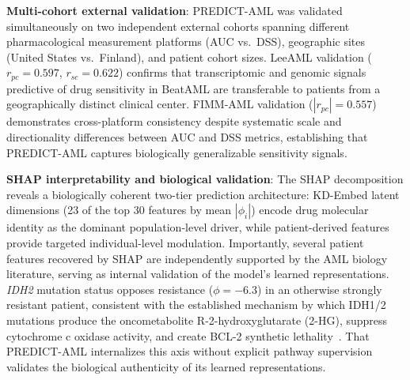 \documentclass[pdflatex,sn-mathphys-num]{sn-jnl}
\theoremstyle{thmstyleone}
\theoremstyle{thmstyletwo}
\theoremstyle{thmstylethree}
\begin{document}
\textbf{Multi-cohort external validation}: PREDICT-AML was validated simultaneously on two independent external cohorts spanning different pharmacological measurement platforms (AUC vs.\ DSS), geographic sites (United States vs.\ Finland), and patient cohort sizes. LeeAML validation ($r_{pc} = 0.597$, $r_{sc} = 0.622$) confirms that transcriptomic and genomic signals predictive of drug sensitivity in BeatAML are transferable to patients from a geographically distinct clinical center. FIMM-AML validation ($|r_{pc}| = 0.557$) demonstrates cross-platform consistency despite systematic scale and directionality differences between AUC and DSS metrics, establishing that PREDICT-AML captures biologically generalizable sensitivity signals. %

\textbf{SHAP interpretability and biological validation}: The SHAP decomposition reveals a biologically coherent two-tier prediction architecture: KD-Embed latent dimensions (23 of the top 30 features by mean $|\phi_i|$) encode drug molecular identity as the dominant population-level driver, while patient-derived features provide targeted individual-level modulation. Importantly, several patient features recovered by SHAP are independently supported by the AML biology literature, serving as internal validation of the model's learned representations. \textit{IDH2} mutation status opposes resistance ($\phi = -6.3$) in an otherwise strongly resistant patient, consistent with the established mechanism by which IDH1/2 mutations produce the oncometabolite R-2-hydroxyglutarate (2-HG), suppress cytochrome c oxidase activity, and create BCL-2 synthetic lethality~\cite{chan2015idh, bisaillon2020genetic}. That PREDICT-AML internalizes this axis without explicit pathway supervision validates the biological authenticity of its learned representations.
\end{document}
